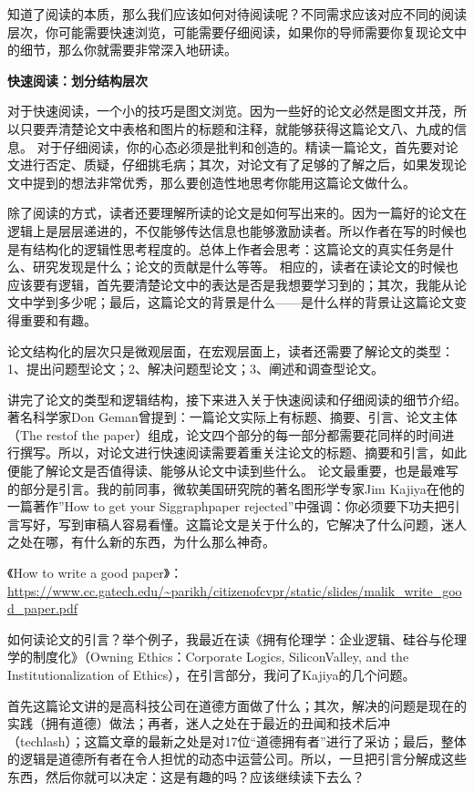 知道了阅读的本质，那么我们应该如何对待阅读呢？不同需求应该对应不同的阅读层次，你可能需要快速浏览，可能需要仔细阅读，如果你的导师需要你复现论文中的细节，那么你就需要非常深入地研读。

{\bf 快速阅读：划分结构层次}

对于快速阅读，一个小的技巧是图文浏览。因为一些好的论文必然是图文并茂，所以只要弄清楚论文中表格和图片的标题和注释，就能够获得这篇论文八、九成的信息。
对于仔细阅读，你的心态必须是批判和创造的。精读一篇论文，首先要对论文进行否定、质疑，仔细挑毛病；其次，对论文有了足够的了解之后，如果发现论文中提到的想法非常优秀，那么要创造性地思考你能用这篇论文做什么。

除了阅读的方式，读者还要理解所读的论文是如何写出来的。因为一篇好的论文在逻辑上是层层递进的，不仅能够传达信息也能够激励读者。所以作者在写的时候也是有结构化的逻辑性思考程度的。总体上作者会思考：这篇论文的真实任务是什么、研究发现是什么；论文的贡献是什么等等。
相应的，读者在读论文的时候也应该要有逻辑，首先要清楚论文中的表达是否是我想要学习到的；其次，我能从论文中学到多少呢；最后，这篇论文的背景是什么——是什么样的背景让这篇论文变得重要和有趣。

论文结构化的层次只是微观层面，在宏观层面上，读者还需要了解论文的类型：1、提出问题型论文；2、解决问题型论文；3、阐述和调查型论文。

讲完了论文的类型和逻辑结构，接下来进入关于快速阅读和仔细阅读的细节介绍。著名科学家Don Geman曾提到：一篇论文实际上有标题、摘要、引言、论文主体（The restof the paper）组成，论文四个部分的每一部分都需要花同样的时间进行撰写。所以，对论文进行快速阅读需要着重关注论文的标题、摘要和引言，如此便能了解论文是否值得读、能够从论文中读到些什么。
论文最重要，也是最难写的部分是引言。我的前同事，微软美国研究院的著名图形学专家Jim Kajiya在他的一篇著作”How to get your Siggraphpaper rejected”中强调：你必须要下功夫把引言写好，写到审稿人容易看懂。这篇论文是关于什么的，它解决了什么问题，迷人之处在哪，有什么新的东西，为什么那么神奇。

《How to write a good paper》：
\url{https://www.cc.gatech.edu/~parikh/citizenofcvpr/static/slides/malik_write_good_paper.pdf}

如何读论文的引言？举个例子，我最近在读《拥有伦理学：企业逻辑、硅谷与伦理学的制度化》（Owning Ethics：Corporate Logics, SiliconValley, and the Institutionalization of Ethics），在引言部分，我问了Kajiya的几个问题。

首先这篇论文讲的是高科技公司在道德方面做了什么；其次，解决的问题是现在的实践（拥有道德）做法；再者，迷人之处在于最近的丑闻和技术后冲（techlash）；这篇文章的最新之处是对17位“道德拥有者”进行了采访；最后，整体的逻辑是道德所有者在令人担忧的动态中运营公司。所以，一旦把引言分解成这些东西，然后你就可以决定：这是有趣的吗？应该继续读下去么？


